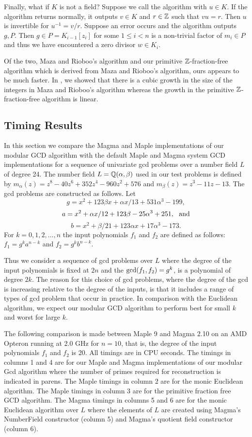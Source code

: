 \documentclass[10pt]{article}
\begin{document}
Finally, what if $K$ is not a field?
Suppose we call the algorithm with $u \in K.$
If the algorithm returns normally, it outputs $v \in K$ and $r \in {\mathbb Z}$
such that $v u = r$.  Then $u$ is invertible for $u^{-1} = v/r$.
Suppose an error occurs and the algorithm outputs $g,P$.
Then $g \in P = K_{i-1}[z_i]$ for some $1 \le i < n$ is a non-trivial
factor of $m_i \in P$ and thus we have encountered a zero divisor
$w \in K_i.$

Of the two, Maza and Rioboo's algorithm and our primitive
${\mathbb Z}$-fraction-free algorithm which is derived from Maza and
Rioboo's algorithm, ours appears to be much faster.  In
\cite{MonvHoeij}, we showed that there is a cubic growth in the size
of the integers in Maza and Rioboo's algorithm whereas the growth in
the primitive ${\mathbb Z}$-fraction-free algorithm is linear.
 

\subsection{Timing Results}

In this section we compare the Magma and Maple
implementations of our modular GCD algorithm with the default
Maple and Magma system GCD implementations for a sequence of
univariate gcd problems over a number field $L$ of degree 24.
The number field $L = {\mathbb Q}(\alpha,\beta)$ used in our test
problems is defined by $m_\alpha(z) = z^8-40 z^6+352 z^4-960 z^2+576$ and
$m_\beta(z) = z^3-11 z-13$.  The gcd problems are constructed as follows.
Let
\[ g = x^2+123 \beta x+\alpha x/13+531 \alpha^3-199,\]
\vspace*{-5mm}
\[ a = x^2+\alpha x/12+123 \beta-25 \alpha^3+251, ~~ {\rm and} \]
\vspace*{-5mm}
\[ b = x^2+\beta/21+123 \alpha x+17 \alpha^3-173. \]
For $k = 0, 1, 2, ..., n$ the input polynomials $f_1$ and $f_2$
are defined as follows: $f_1 = g^k a^{n-k}$ and $f_2 = g^k b^{n-k}.$

Thus we consider a sequence of gcd problems over $L$ where the degree of
the input polynomials is fixed at $2 n$ and the ${\rm gcd}(f_1,f_2) = g^k$,
is a polynomial of degree $2 k$.
The reason for this choice of gcd problems, where
the degree of the gcd is increasing relative to the
degree of the inputs, is that it includes a range of types of gcd problem
that occur in practice.  In comparison with the Euclidean algorithm,
we expect our modular GCD algorithm to perform best for small $k$ and
worst for large $k$.

The following comparison is made between Maple 9 and Magma 2.10 on
an AMD Opteron running at 2.0 GHz for $n=10$, that is, the degree of
the input polynomials $f_1$ and $f_2$ is 20. All timings are in CPU
seconds. The timings in columns 1 and 4 are for our Maple and Magma
implementations of our modular Gcd algorithm where the number of
primes required for reconstruction is indicated in parens. 
The Maple timings in column 2 are for the monic Euclidean algorithm.
The Maple timings in column 3 are for the primitive fraction free GCD algorithm.
The Magma timings in columns 5 and 6 are for the monic Euclidean
algorithm over $L$ where the elements of $L$ are created using
Magma's NumberField constructor (column 5) and Magma's quotient
field constructor (column 6).
\end{document}
